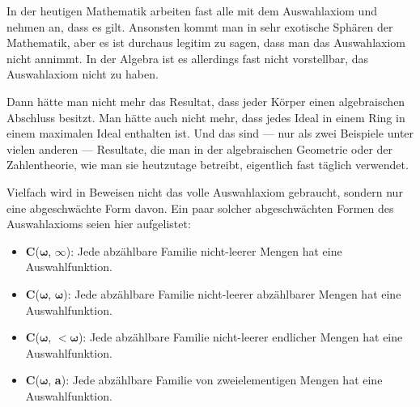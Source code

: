 \begin{spoken-clean}[00:01:55 - 00:05:57]
In der heutigen Mathematik arbeiten fast alle mit dem Auswahlaxiom und nehmen an, dass es gilt. Ansonsten kommt man in sehr exotische Sphären der Mathematik, aber es ist durchaus legitim zu sagen, dass man das Auswahlaxiom nicht annimmt. In der Algebra ist es allerdings fast nicht vorstellbar, das Auswahlaxiom nicht zu haben.

Dann hätte man nicht mehr das Resultat, dass jeder Körper einen algebraischen Abschluss besitzt. Man hätte auch nicht mehr, dass jedes Ideal in einem Ring in einem maximalen Ideal enthalten ist. Und das sind --- nur als zwei Beispiele unter vielen anderen --- Resultate, die man in der algebraischen Geometrie oder der Zahlentheorie, wie man sie heutzutage betreibt, eigentlich fast täglich verwendet.
\end{spoken-clean}

\begin{nice-box}
Vielfach wird in Beweisen nicht das volle Auswahlaxiom gebraucht, sondern nur eine abgeschwächte Form davon. Ein paar solcher abgeschwächten Formen des Auswahlaxioms seien hier aufgelistet:
\begin{itemize}
    \item \textbf{C}($\boldsymbol{\omega}$, $\boldsymbol{\infty}$): Jede abzählbare Familie nicht-leerer Mengen hat eine Auswahlfunktion.
    \item \textbf{C}($\boldsymbol{\omega}$, $\boldsymbol{\omega}$): Jede abzählbare Familie nicht-leerer abzählbarer Mengen hat eine Auswahlfunktion.
    \item \textbf{C}($\boldsymbol{\omega}$, $\boldsymbol{<\omega}$): Jede abzählbare Familie nicht-leerer endlicher Mengen hat eine Auswahlfunktion.
    \item \textbf{C}($\boldsymbol{\omega}$, \textbf{a}): Jede abzählbare Familie von zweielementigen Mengen hat eine Auswahlfunktion.
\end{itemize}
\end{nice-box}

